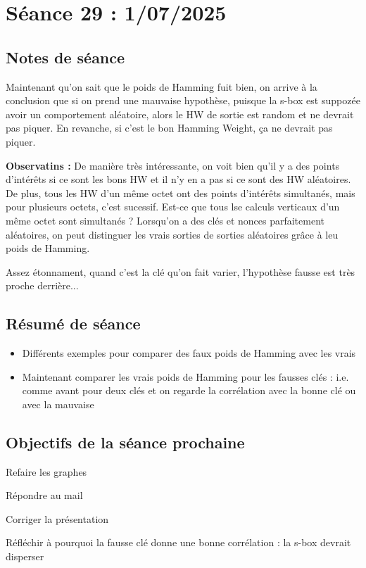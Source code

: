\documentclass[12pt]{article}
\newcommand{\cmark}{\ding{51}}%
\newcommand{\done}{\rlap{$\square$}{\raisebox{2pt}{\large\hspace{1pt}\cmark}}%
	\hspace{-2.5pt}}
\begin{document}
	
	\section{Séance 29 : 1/07/2025}
	\subsection{Notes de séance}
	Maintenant qu'on sait que le poids de Hamming fuit bien, on arrive à la conclusion que si on prend une mauvaise hypothèse, puisque la s-box est suppozée avoir un comportement aléatoire, alors le HW de sortie est random et ne devrait pas piquer. En revanche, si c'est le bon Hamming Weight, ça ne devrait pas piquer.
	
	\noindent \textbf{Observatins :} De manière très intéressante, on voit bien qu'il y a des points d'intérêts si ce sont les bons HW et il n'y en a pas si ce sont des HW aléatoires. De plus, tous les HW d'un même octet ont des points d'intérêts simultanés, mais pour plusieurs octets, c'est sucessif. Est-ce que tous lse calculs verticaux d'un même octet sont simultanés ? Lorsqu'on a des clés et nonces parfaitement aléatoires, on peut distinguer les vrais sorties de sorties aléatoires grâce à leu poids de Hamming.
	
	\noindent Assez étonnament, quand c'est la clé qu'on fait varier, l'hypothèse fausse est très proche derrière...
	
	\subsection{Résumé de séance}
	\begin{itemize}
		\item Différents exemples pour comparer des faux poids de Hamming avec les vrais
		\item Maintenant comparer les vrais poids de Hamming pour les fausses clés : i.e. comme avant pour deux clés et on regarde la corrélation avec la bonne clé ou avec la mauvaise
	\end{itemize}
	
	\subsection{Objectifs de la séance prochaine}
	\begin{todolist}
		\item[\done] Refaire les graphes
		\item[\done] Répondre au mail
		\item[\done] Corriger la présentation
		\item[\done] Réfléchir à pourquoi la fausse clé donne une bonne corrélation : la s-box devrait disperser
	\end{todolist}
	
\end{document}

